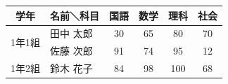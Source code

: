 \documentclass{ltjsarticle}
\begin{document}
\begin{table}[htbp]
  \begin{tabular}{|c|l||c|c|c|c|}
    \hline
    学年 & 名前＼科目 & 国語 & 数学 & 理科 & 社会 \\
    \hline \hline
    \multirow{2}{*}{1年1組}&田中 太郎 & 30 & 65 & 80 & 70 \\
    \cline{2-6}
    &佐藤 次郎 & 91 & 74 & 95 & 12 \\
    \hline
    1年2組&鈴木 花子 & 84 & 98 & 100 & 68 \\
    \hline
  \end{tabular}
\end{table}
\end{document}
